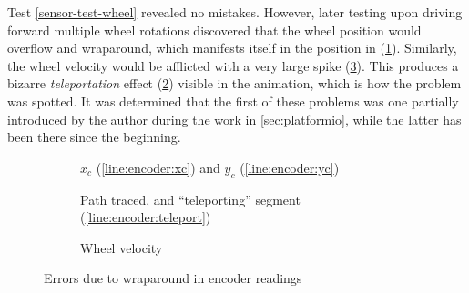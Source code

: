 \documentclass[main.tex]{subfiles}
\begin{document}
		Test \ref{sensor-test-wheel} revealed no mistakes.
		However, later testing upon driving forward multiple wheel rotations discovered that the wheel position would overflow and wraparound, which manifests itself in the position in (\cref{fig:bad-wheel:pos}). Similarly, the wheel velocity would be afflicted with a very large spike (\cref{fig:bad-wheel:vel}). This produces a bizarre \emph{teleportation} effect (\cref{fig:bad-wheel:tele}) visible in the animation, which is how the problem was spotted.
		It was determined that the first of these problems was one partially introduced by the author during the work in \cref{sec:platformio}, while the latter has been there since the beginning.

		\begin{figure}
			\newlength{\mypadding}
			\setlength{\mypadding}{1.5cm}
			\newlength{\mywidth}
			\setlength{\mywidth}{(\linewidth-2\mypadding)/3}
			\begin{subfigure}[t]{\mywidth}
				
				\caption{$x_c$ (\ref{line:encoder:xc}) and $y_c$ (\ref{line:encoder:yc})}
				\label{fig:bad-wheel:pos}
			\end{subfigure}\hfill
			\begin{subfigure}[t]{\mywidth}
				
				\caption{Path traced, and \enquote{teleporting} segment (\ref{line:encoder:teleport})}
				\label{fig:bad-wheel:tele}
			\end{subfigure}\hfill
			\begin{subfigure}[t]{\mywidth}
				
				\caption{Wheel velocity}
				\label{fig:bad-wheel:vel}
			\end{subfigure}
			\caption{Errors due to wraparound in encoder readings}
			\label{fig:bad-wheel}
		\end{figure}
\end{document}
